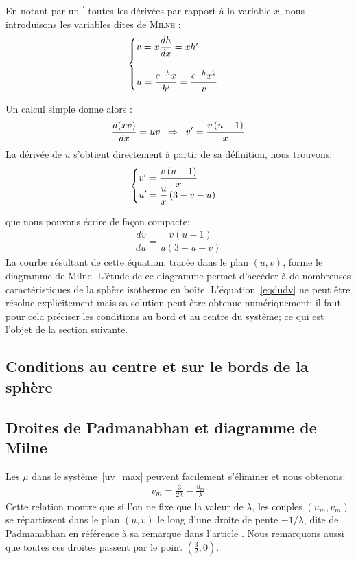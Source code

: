 		En notant par un $^\prime$ toutes les dérivées par rapport à la variable $x$, nous introduisons les variables dites de \textsc{Milne :}
		\begin{align}
			\begin{cases}
			v = x \dfrac{d h}{dx} = x h' \\
			\\
			u = \dfrac{e^{-h} x}{h'} = \dfrac{e^{-h} x^2}{v}
		\end{cases}\label{syst_uv}
		\end{align}
		
Un calcul simple donne alors :
\begin{align}
	\dfrac{d(xv)}{dx} = uv \;\;\Rightarrow\;\; v' = \frac{v \left( u - 1\right)}{x} \notag
\end{align}
La dérivée de $u$ s'obtient directement à partir de sa définition, nous trouvons:
	$$\begin{cases}
		v' = \dfrac{v \left( u - 1\right)}{x} \\
		u' = \dfrac{u}{x}\left(3 - v - u\right)
	\end{cases} \label{systdudv}$$
	
	que nous pouvons écrire de façon compacte:
	\begin{align}
		\dfrac{d v}{d u} = \dfrac{v \left( u - 1\right)}{u \left(3 - u - v\right)}
		\label{eqdudv}
	\end{align}
	La courbe résultant de cette équation, tracée dans le plan $\left(u, v\right)$, forme le diagramme
	de Milne. L'étude de ce diagramme permet d'accéder à de nombreuses caractéristiques de la sphère isotherme en
	boîte. L'équation~\ref{eqdudv} ne peut être résolue explicitement mais sa solution peut être obtenue
	numériquement: il faut pour cela préciser les conditions au bord et au centre du système; ce qui est l'objet de la
	section suivante.
	

\subsection{Conditions au centre et sur le bords de la sphère}
	

\subsection{Droites de Padmanabhan et diagramme de Milne}
	Les $\mu$ dans le système~\ref{uv_max} peuvent facilement s'éliminer et nous obtenons:
	\begin{align}
		v_m = \frac{3}{2\lambda} - \frac{u_m}{\lambda}\label{droitePb}
	\end{align}
	Cette relation montre que si l'on ne fixe que la valeur de $\lambda$,  les couples $(u_m,v_m)$  se répartissent
	dans le plan $(u,v)$ le long d'une droite de pente $-1/\lambda$, dite de Padmanabhan en référence à sa remarque
	dans l'article \cite{1989ApJS...71..651P}. Nous remarquons aussi que toutes ces droites passent par le point
	$(\frac{3}{2},0)$.
	
